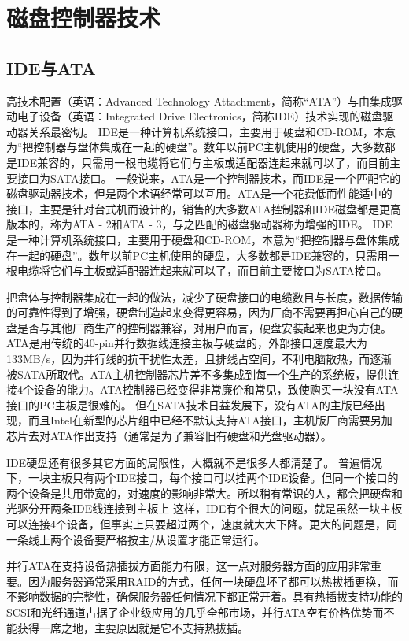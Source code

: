\section{磁盘控制器技术}


\subsection{IDE与ATA}
高技术配置（英语：Advanced Technology Attachment，简称“ATA”）与由集成驱动电子设备（英语：Integrated Drive Electronics，简称IDE）技术实现的磁盘驱动器关系最密切。
IDE是一种计算机系统接口，主要用于硬盘和CD-ROM，本意为“把控制器与盘体集成在一起的硬盘”。数年以前PC主机使用的硬盘，大多数都是IDE兼容的，只需用一根电缆将它们与主板或适配器连起来就可以了，而目前主要接口为SATA接口。
一般说来，ATA是一个控制器技术，而IDE是一个匹配它的磁盘驱动器技术，但是两个术语经常可以互用。ATA是一个花费低而性能适中的接口，主要是针对台式机而设计的，销售的大多数ATA控制器和IDE磁盘都是更高版本的，称为ATA - 2和ATA - 3，与之匹配的磁盘驱动器称为增强的IDE。
IDE是一种计算机系统接口，主要用于硬盘和CD-ROM，本意为“把控制器与盘体集成在一起的硬盘”。数年以前PC主机使用的硬盘，大多数都是IDE兼容的，只需用一根电缆将它们与主板或适配器连起来就可以了，而目前主要接口为SATA接口。

把盘体与控制器集成在一起的做法，减少了硬盘接口的电缆数目与长度，数据传输的可靠性得到了增强，硬盘制造起来变得更容易，因为厂商不需要再担心自己的硬盘是否与其他厂商生产的控制器兼容，对用户而言，硬盘安装起来也更为方便。
ATA是用传统的40-pin并行数据线连接主板与硬盘的，外部接口速度最大为133MB/s，因为并行线的抗干扰性太差，且排线占空间，不利电脑散热，而逐渐被SATA所取代。ATA主机控制器芯片差不多集成到每一个生产的系统板，提供连接4个设备的能力。ATA控制器已经变得非常廉价和常见，致使购买一块没有ATA接口的PC主板是很难的。
但在SATA技术日益发展下，没有ATA的主版已经出现，而且Intel在新型的芯片组中已经不默认支持ATA接口，主机版厂商需要另加芯片去对ATA作出支持（通常是为了兼容旧有硬盘和光盘驱动器）。

IDE硬盘还有很多其它方面的局限性，大概就不是很多人都清楚了。
普遍情况下，一块主板只有两个IDE接口，每个接口可以挂两个IDE设备。但同一个接口的两个设备是共用带宽的，对速度的影响非常大。所以稍有常识的人，都会把硬盘和光驱分开两条IDE线连接到主板上 
这样，IDE有个很大的问题，就是虽然一块主板可以连接4个设备，但事实上只要超过两个，速度就大大下降。更大的问题是，同一条线上两个设备要严格按主/从设置才能正常运行。

并行ATA在支持设备热插拔方面能力有限，这一点对服务器方面的应用非常重要。因为服务器通常采用RAID的方式，任何一块硬盘坏了都可以热拔插更换，而不影响数据的完整性，确保服务器任何情况下都正常开着。具有热插拔支持功能的SCSI和光纤通道占据了企业级应用的几乎全部市场，并行ATA空有价格优势而不能获得一席之地，主要原因就是它不支持热拔插。 

